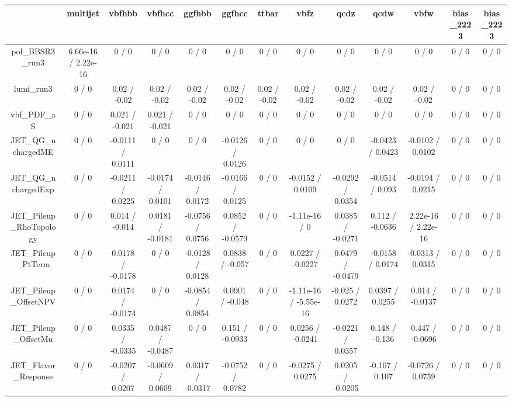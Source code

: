 \documentclass[10pt]{article}
\begin{document}
\begin{table}[htbp]
\begin{center}
\begin{tabular}{|c|c|c|c|c|c|c|c|c|c|c|c|c|}
\hline 
      & multijet      & vbfhbb      & vbfhcc      & ggfhbb      & ggfhcc      & ttbar      & vbfz      & qcdz      & qcdw      & vbfw      & bias_2223      & bias_2223 \\ 
\hline 
  pol_BBSR3_run3 & 6.66e-16 / 2.22e-16 & 0 / 0 & 0 / 0 & 0 / 0 & 0 / 0 & 0 / 0 & 0 / 0 & 0 / 0 & 0 / 0 & 0 / 0 & 0 / 0 & 0 / 0 \\ 
  lumi_run3 & 0 / 0 & 0.02 / -0.02 & 0.02 / -0.02 & 0.02 / -0.02 & 0.02 / -0.02 & 0.02 / -0.02 & 0.02 / -0.02 & 0.02 / -0.02 & 0.02 / -0.02 & 0.02 / -0.02 & 0 / 0 & 0 / 0 \\ 
  vbf_PDF_aS & 0 / 0 & 0.021 / -0.021 & 0.021 / -0.021 & 0 / 0 & 0 / 0 & 0 / 0 & 0 / 0 & 0 / 0 & 0 / 0 & 0 / 0 & 0 / 0 & 0 / 0 \\ 
  JET_QG_nchargedME & 0 / 0 & -0.0111 / 0.0111 & 0 / 0 & 0 / 0 & -0.0126 / 0.0126 & 0 / 0 & 0 / 0 & 0 / 0 & -0.0423 / 0.0423 & -0.0102 / 0.0102 & 0 / 0 & 0 / 0 \\ 
  JET_QG_nchargedExp & 0 / 0 & -0.0211 / 0.0225 & -0.0174 / 0.0101 & -0.0146 / 0.0172 & -0.0166 / 0.0125 & 0 / 0 & -0.0152 / 0.0109 & -0.0292 / 0.0354 & -0.0514 / 0.093 & -0.0194 / 0.0215 & 0 / 0 & 0 / 0 \\ 
  JET_Pileup_RhoTopology & 0 / 0 & 0.014 / -0.014 & 0.0181 / -0.0181 & -0.0756 / 0.0756 & 0.0852 / -0.0579 & 0 / 0 & -1.11e-16 / 0 & 0.0385 / -0.0271 & 0.112 / -0.0636 & 2.22e-16 / 2.22e-16 & 0 / 0 & 0 / 0 \\ 
  JET_Pileup_PtTerm & 0 / 0 & 0.0178 / -0.0178 & 0 / 0 & -0.0128 / 0.0128 & 0.0838 / -0.057 & 0 / 0 & 0.0227 / -0.0227 & 0.0479 / -0.0479 & -0.0158 / 0.0174 & -0.0313 / 0.0315 & 0 / 0 & 0 / 0 \\ 
  JET_Pileup_OffsetNPV & 0 / 0 & 0.0174 / -0.0174 & 0 / 0 & -0.0854 / 0.0854 & 0.0901 / -0.048 & 0 / 0 & -1.11e-16 / -5.55e-16 & -0.025 / 0.0272 & 0.0397 / 0.0255 & 0.014 / -0.0137 & 0 / 0 & 0 / 0 \\ 
  JET_Pileup_OffsetMu & 0 / 0 & 0.0335 / -0.0335 & 0.0487 / -0.0487 & 0 / 0 & 0.151 / -0.0933 & 0 / 0 & 0.0256 / -0.0241 & -0.0221 / 0.0357 & 0.148 / -0.136 & 0.447 / -0.0696 & 0 / 0 & 0 / 0 \\ 
  JET_Flavor_Response & 0 / 0 & -0.0207 / 0.0207 & -0.0609 / 0.0609 & 0.0317 / -0.0317 & -0.0752 / 0.0782 & 0 / 0 & -0.0275 / 0.0275 & 0.0205 / -0.0205 & -0.107 / 0.107 & -0.0726 / 0.0759 & 0 / 0 & 0 / 0 \\ 

\end{tabular}
\end{center}
\end{table}
\end{document}
